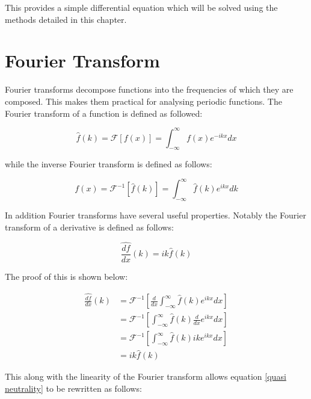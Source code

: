 This provides a simple differential equation which will be solved using the methods detailed in this chapter.

\section{Fourier Transform}

Fourier transforms decompose functions into the frequencies of which they are composed. This makes them practical for analysing periodic functions. The Fourier transform of a function is defined as followed:

\begin{equation}
 \hat{f}(k)=\mathcal{F}\left[f(x)\right]=\int_{-\infty}^{\infty}f(x)e^{-i k x}dx
\end{equation}

while the inverse Fourier transform is defined as follows:

\begin{equation}
 f(x)=\mathcal{F}^{-1}\left[\hat{f}(k)\right]=\int_{-\infty}^{\infty}\hat{f}(k)e^{i k x}dk
\end{equation}

In addition Fourier transforms have several useful properties. Notably the Fourier transform of a derivative is defined as follows:

$$\widehat{\frac{df}{dx}}(k)=i k \hat{f}(k)$$

The proof of this is shown below:

\begin{align*}
 \widehat{\frac{df}{dx}}(k)&=\mathcal{F}^{-1}\left[\frac{d}{dx}\int_{-\infty}^{\infty}\hat{f}(k)e^{i k x}dx\right]\\
 &=\mathcal{F}^{-1}\left[\int_{-\infty}^{\infty}\hat{f}(k)\frac{d}{dx}e^{i k x}dx\right]\\
 &=\mathcal{F}^{-1}\left[\int_{-\infty}^{\infty}\hat{f}(k)i k e^{i k x}dx\right]\\
 &=i k \hat{f}(k)
\end{align*}

This along with the linearity of the Fourier transform allows equation \ref{quasi neutrality} to be rewritten as follows:

